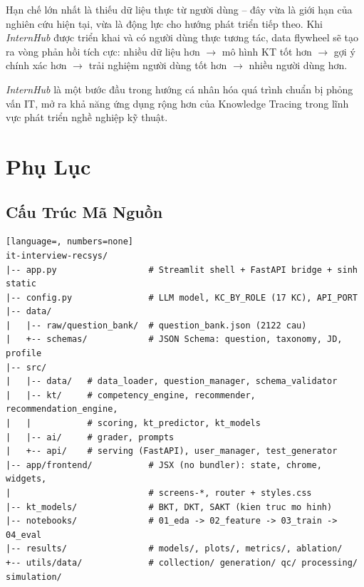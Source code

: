 \documentclass[12pt, a4paper]{report}
\newcommand{\system}{\textit{InternHub}}
\begin{document}
Hạn chế lớn nhất là thiếu dữ liệu thực từ người dùng -- đây vừa là giới hạn của nghiên cứu hiện tại, vừa là động lực cho hướng phát triển tiếp theo. Khi \system{} được triển khai và có người dùng thực tương tác, data flywheel sẽ tạo ra vòng phản hồi tích cực: nhiều dữ liệu hơn $\to$ mô hình KT tốt hơn $\to$ gợi ý chính xác hơn $\to$ trải nghiệm người dùng tốt hơn $\to$ nhiều người dùng hơn.

\system{} là một bước đầu trong hướng cá nhân hóa quá trình chuẩn bị phỏng vấn IT, mở ra khả năng ứng dụng rộng hơn của Knowledge Tracing trong lĩnh vực phát triển nghề nghiệp kỹ thuật.


\appendix
\chapter{Phụ Lục}
\label{chap:appendix}

\section{Cấu Trúc Mã Nguồn}
\label{apx:repo}

\begin{lstlisting}[language=, numbers=none]
it-interview-recsys/
|-- app.py                  # Streamlit shell + FastAPI bridge + sinh static
|-- config.py               # LLM model, KC_BY_ROLE (17 KC), API_PORT
|-- data/
|   |-- raw/question_bank/  # question_bank.json (2122 cau)
|   +-- schemas/            # JSON Schema: question, taxonomy, JD, profile
|-- src/
|   |-- data/   # data_loader, question_manager, schema_validator
|   |-- kt/     # competency_engine, recommender, recommendation_engine,
|   |           # scoring, kt_predictor, kt_models
|   |-- ai/     # grader, prompts
|   +-- api/    # serving (FastAPI), user_manager, test_generator
|-- app/frontend/           # JSX (no bundler): state, chrome, widgets,
|                           # screens-*, router + styles.css
|-- kt_models/              # BKT, DKT, SAKT (kien truc mo hinh)
|-- notebooks/              # 01_eda -> 02_feature -> 03_train -> 04_eval
|-- results/                # models/, plots/, metrics/, ablation/
+-- utils/data/             # collection/ generation/ qc/ processing/ simulation/
\end{lstlisting}

\end{document}
